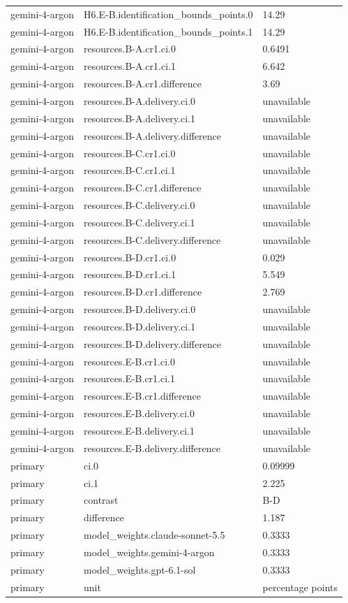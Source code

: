 \begin{tabular}{lll}
gemini-4-argon & H6.E-B.identification\_bounds\_points.0 & 14.29 \\
gemini-4-argon & H6.E-B.identification\_bounds\_points.1 & 14.29 \\
gemini-4-argon & resources.B-A.cr1.ci.0 & 0.6491 \\
gemini-4-argon & resources.B-A.cr1.ci.1 & 6.642 \\
gemini-4-argon & resources.B-A.cr1.difference & 3.69 \\
gemini-4-argon & resources.B-A.delivery.ci.0 & unavailable \\
gemini-4-argon & resources.B-A.delivery.ci.1 & unavailable \\
gemini-4-argon & resources.B-A.delivery.difference & unavailable \\
gemini-4-argon & resources.B-C.cr1.ci.0 & unavailable \\
gemini-4-argon & resources.B-C.cr1.ci.1 & unavailable \\
gemini-4-argon & resources.B-C.cr1.difference & unavailable \\
gemini-4-argon & resources.B-C.delivery.ci.0 & unavailable \\
gemini-4-argon & resources.B-C.delivery.ci.1 & unavailable \\
gemini-4-argon & resources.B-C.delivery.difference & unavailable \\
gemini-4-argon & resources.B-D.cr1.ci.0 & 0.029 \\
gemini-4-argon & resources.B-D.cr1.ci.1 & 5.549 \\
gemini-4-argon & resources.B-D.cr1.difference & 2.769 \\
gemini-4-argon & resources.B-D.delivery.ci.0 & unavailable \\
gemini-4-argon & resources.B-D.delivery.ci.1 & unavailable \\
gemini-4-argon & resources.B-D.delivery.difference & unavailable \\
gemini-4-argon & resources.E-B.cr1.ci.0 & unavailable \\
gemini-4-argon & resources.E-B.cr1.ci.1 & unavailable \\
gemini-4-argon & resources.E-B.cr1.difference & unavailable \\
gemini-4-argon & resources.E-B.delivery.ci.0 & unavailable \\
gemini-4-argon & resources.E-B.delivery.ci.1 & unavailable \\
gemini-4-argon & resources.E-B.delivery.difference & unavailable \\
primary & ci.0 & 0.09999 \\
primary & ci.1 & 2.225 \\
primary & contrast & B-D \\
primary & difference & 1.187 \\
primary & model\_weights.claude-sonnet-5.5 & 0.3333 \\
primary & model\_weights.gemini-4-argon & 0.3333 \\
primary & model\_weights.gpt-6.1-sol & 0.3333 \\
primary & unit & percentage points \\
\end{tabular}
